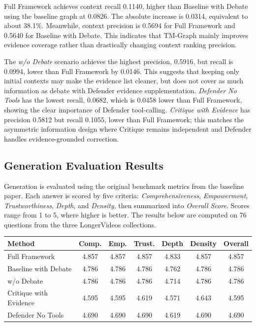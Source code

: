 \documentclass[12pt,a4paper]{article}
\begin{document}
Full Framework achieves context recall 0.1140, higher than Baseline with Debate using the baseline graph at 0.0826. The absolute increase is 0.0314, equivalent to about 38.1\%. Meanwhile, context precision is 0.5694 for Full Framework and 0.5640 for Baseline with Debate. This indicates that TM-Graph mainly improves evidence coverage rather than drastically changing context ranking precision.

The \textit{w/o Debate} scenario achieves the highest precision, 0.5916, but recall is 0.0994, lower than Full Framework by 0.0146. This suggests that keeping only initial contexts may make the evidence list cleaner, but does not cover as much information as debate with Defender evidence supplementation. \textit{Defender No Tools} has the lowest recall, 0.0682, which is 0.0458 lower than Full Framework, showing the clear importance of Defender tool-calling. \textit{Critique with Evidence} has precision 0.5812 but recall 0.1055, lower than Full Framework; this matches the asymmetric information design where Critique remains independent and Defender handles evidence-grounded correction.

\subsection{Generation Evaluation Results}

Generation is evaluated using the original benchmark metrics from the baseline paper. Each answer is scored by five criteria: \textit{Comprehensiveness}, \textit{Empowerment}, \textit{Trustworthiness}, \textit{Depth}, and \textit{Density}, then summarized into \textit{Overall Score}. Scores range from 1 to 5, where higher is better. The results below are computed on 76 questions from the three LongerVideos collections.

\begin{center}
\scriptsize
\setlength{\tabcolsep}{2.5pt}
\begin{tabular}{p{}cccccc}
\toprule
\textbf{Method} & \textbf{Comp.} & \textbf{Emp.} & \textbf{Trust.} & \textbf{Depth} & \textbf{Density} & \textbf{Overall} \\
\midrule
Full Framework & 4.857 & 4.857 & 4.857 & 4.833 & 4.857 & 4.857 \\
Baseline with Debate & 4.786 & 4.786 & 4.786 & 4.762 & 4.786 & 4.786 \\
w/o Debate & 4.786 & 4.786 & 4.786 & 4.714 & 4.786 & 4.786 \\
Critique with Evidence & 4.595 & 4.595 & 4.619 & 4.571 & 4.643 & 4.595 \\
Defender No Tools & 4.690 & 4.690 & 4.690 & 4.619 & 4.690 & 4.690 \\
\bottomrule
\end{tabular}
\end{center}
\end{document}
